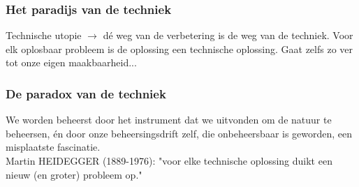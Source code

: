\documentclass[11pt,a4paper]{article}
\begin{document}
\subsubsection*{Het paradijs van de techniek}
Technische utopie $\rightarrow$ d\'e weg van de verbetering is de weg van de techniek. Voor elk oplosbaar probleem is de oplossing een technische oplossing. Gaat zelfs zo ver tot onze eigen maakbaarheid...
\subsubsection*{De paradox van de techniek}
We worden beheerst door het instrument dat we uitvonden om de natuur te beheersen, \'en door onze beheersingsdrift zelf, die onbeheersbaar is geworden, een misplaatste fascinatie.
\\
Martin HEIDEGGER (1889-1976): "voor elke technische oplossing duikt een nieuw (en groter) probleem op."
\end{document}
